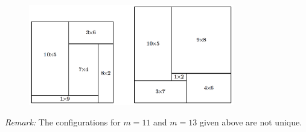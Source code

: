 \documentclass[11pt]{article}
\begin{document}
\begin{enumerate}
    \begin{figure}[h!]
        \centering
        \includegraphics[width=0.8\textwidth]{seniortest1_q2.PNG}
    \end{figure}
    
    \textit{Remark:} The configurations for $m = 11$ and $m = 13$ given above are not unique.

\end{enumerate}
\end{document}
